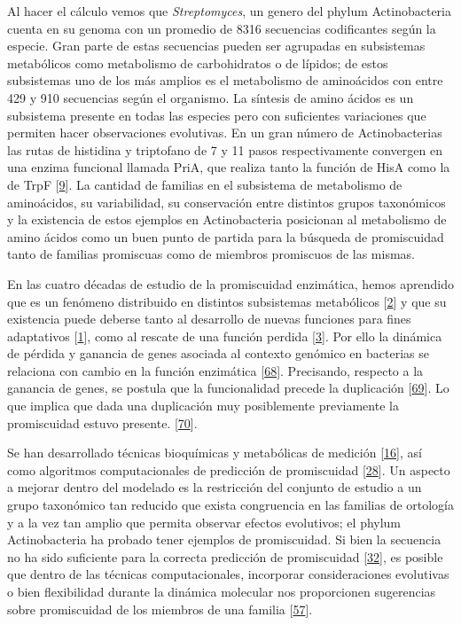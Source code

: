 \documentclass[12pt,twoside]{reedthesis}
\begin{document}
  Al hacer el cálculo vemos que \emph{Streptomyces}, un genero del phylum
  Actinobacteria cuenta en su genoma con un promedio de 8316 secuencias
  codificantes según la especie. Gran parte de estas secuencias pueden ser
  agrupadas en subsistemas metabólicos como metabolismo de carbohidratos o
  de lípidos; de estos subsistemas uno de los más amplios es el
  metabolismo de aminoácidos con entre 429 y 910 secuencias según el
  organismo. La síntesis de amino ácidos es un subsistema presente en
  todas las especies pero con suficientes variaciones que permiten hacer
  observaciones evolutivas. En un gran número de Actinobacterias las rutas
  de histidina y triptofano de 7 y 11 pasos respectivamente convergen en
  una enzima funcional llamada PriA, que realiza tanto la función de HisA
  como la de TrpF
  {[}\protect\hyperlink{ref-baronagomez_occurrence_2003}{9}{]}. La
  cantidad de familias en el subsistema de metabolismo de aminoácidos, su
  variabilidad, su conservación entre distintos grupos taxonómicos y la
  existencia de estos ejemplos en Actinobacteria posicionan al metabolismo
  de amino ácidos como un buen punto de partida para la búsqueda de
  promiscuidad tanto de familias promiscuas como de miembros promiscuos de
  las mismas.
  
  En las cuatro décadas de estudio de la promiscuidad enzimática, hemos
  aprendido que es un fenómeno distribuido en distintos subsistemas
  metabólicos {[}\protect\hyperlink{ref-nam_network_2012}{2}{]} y que su
  existencia puede deberse tanto al desarrollo de nuevas funciones para
  fines adaptativos {[}\protect\hyperlink{ref-jensen_enzyme_1976}{1}{]},
  como al rescate de una función perdida
  {[}\protect\hyperlink{ref-patrick_multicopy_2007}{3}{]}. Por ello la
  dinámica de pérdida y ganancia de genes asociada al contexto genómico en
  bacterias se relaciona con cambio en la función enzimática
  {[}\protect\hyperlink{ref-zhao_discovery_2013}{68}{]}. Precisando,
  respecto a la ganancia de genes, se postula que la funcionalidad precede
  la duplicación {[}\protect\hyperlink{ref-hughes_evolution_1994}{69}{]}.
  Lo que implica que dada una duplicación muy posiblemente previamente la
  promiscuidad estuvo presente.
  {[}\protect\hyperlink{ref-gerlt_divergent_2001}{70}{]}.
  
  Se han desarrollado técnicas bioquímicas y metabólicas de medición
  {[}\protect\hyperlink{ref-nath_quantitative_2008}{16}{]}, así como
  algoritmos computacionales de predicción de promiscuidad
  {[}\protect\hyperlink{ref-carbonell_molecular_2010}{28}{]}. Un aspecto a
  mejorar dentro del modelado es la restricción del conjunto de estudio a
  un grupo taxonómico tan reducido que exista congruencia en las familias
  de ortología y a la vez tan amplio que permita observar efectos
  evolutivos; el phylum Actinobacteria ha probado tener ejemplos de
  promiscuidad. Si bien la secuencia no ha sido suficiente para la
  correcta predicción de promiscuidad
  {[}\protect\hyperlink{ref-verdel-aranda_molecular_2015}{32}{]}, es
  posible que dentro de las técnicas computacionales, incorporar
  consideraciones evolutivas o bien flexibilidad durante la dinámica
  molecular nos proporcionen sugerencias sobre promiscuidad de los
  miembros de una familia
  {[}\protect\hyperlink{ref-james_conformational_2003}{57}{]}.
  
\end{document}
